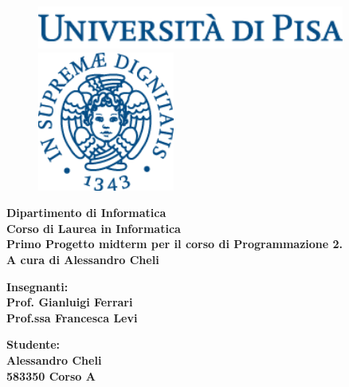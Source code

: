 \documentclass[12pt]{report}
\begin{document}
\begin{titlepage}
\begin{figure}[t]
	\centering\includegraphics[width=0.9\textwidth]{scritta}
    \centering\includegraphics[width=0.4\textwidth]{logo}
\end{figure}

\begin{center}
	\textbf{ Dipartimento di Informatica\\ Corso di Laurea in Informatica\\}
	\vspace{15mm}
    {\LARGE{\bf Primo Progetto midterm per il corso di Programmazione 2.}}\\
	\vspace{3mm}
	{\LARGE{\bf A cura di Alessandro Cheli}}\\
\end{center}

\vspace{18mm}

\begin{minipage}[t]{0.47\textwidth}
	{\large{\bf Insegnanti:\\ Prof. Gianluigi Ferrari\\ Prof.ssa Francesca Levi}}
\end{minipage}\hfill\begin{minipage}[t]{0.47\textwidth}\raggedleft
	{\large{\bf Studente: \\Alessandro Cheli \\ 583350 Corso A\\ }}
\end{minipage}

\vspace{18mm}


\end{titlepage}
\end{document}
